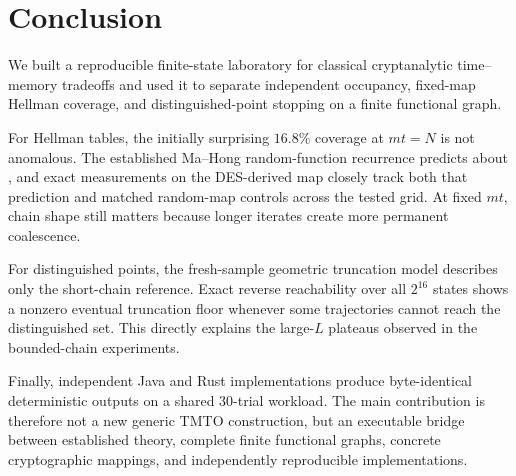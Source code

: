 \section{Conclusion}

We built a reproducible finite-state laboratory for classical cryptanalytic
time--memory tradeoffs and used it to separate independent occupancy,
fixed-map Hellman coverage, and distinguished-point stopping on a finite
functional graph.

For Hellman tables, the initially surprising $16.8\%$ coverage at $mt=N$ is
not anomalous. The established Ma--Hong random-function recurrence predicts
about \StressMH{}, and exact measurements on the DES-derived map closely track
both that prediction and matched random-map controls across the tested grid.
At fixed $mt$, chain shape still matters because longer iterates create more
permanent coalescence.

For distinguished points, the fresh-sample geometric truncation model
describes only the short-chain reference. Exact reverse reachability over all
$2^{16}$ states shows a nonzero eventual truncation floor whenever some
trajectories cannot reach the distinguished set. This directly explains the
large-$L$ plateaus observed in the bounded-chain experiments.

Finally, independent Java and Rust implementations produce byte-identical
deterministic outputs on a shared 30-trial workload. The main contribution is
therefore not a new generic TMTO construction, but an executable bridge between
established theory, complete finite functional graphs, concrete cryptographic
mappings, and independently reproducible implementations.
